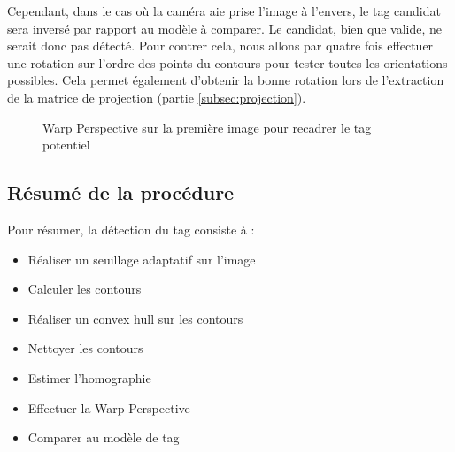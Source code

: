            Cependant, dans le cas où la caméra aie prise l'image à l'envers, le tag candidat sera inversé par rapport au modèle à comparer. Le candidat, bien que valide, ne serait donc pas détecté. Pour contrer cela, nous allons par quatre fois effectuer une rotation sur l'ordre des points du contours pour tester toutes les orientations possibles. Cela permet également d'obtenir la bonne rotation lors de l'extraction de la matrice de projection (partie \ref{subsec:projection}).

        \begin{figure}[h]
            \centering
            \hspace{.02\textwidth}
            \caption{Warp Perspective sur la première image pour recadrer le tag potentiel}
        \end{figure}
            

        \subsection{Résumé de la procédure}

        Pour résumer, la détection du tag consiste à :

        \begin{itemize}
            \item Réaliser un seuillage adaptatif sur l'image
            \item Calculer les contours
            \item Réaliser un convex hull sur les contours
            \item Nettoyer les contours
            \item Estimer l'homographie
            \item Effectuer la Warp Perspective
            \item Comparer au modèle de tag
        \end{itemize}

